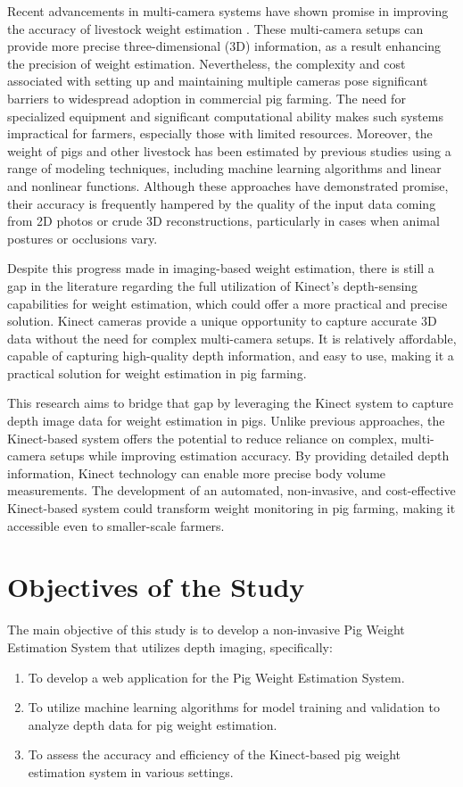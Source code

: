 {Recent advancements in multi-camera systems have shown promise in improving the accuracy of livestock weight estimation \citep{dohmen2022computer}. These multi-camera setups can provide more precise three-dimensional (3D) information, as a result enhancing the precision of weight estimation. Nevertheless, the complexity and cost associated with setting up and maintaining multiple cameras pose significant barriers to widespread adoption in commercial pig farming. The need for specialized equipment and significant computational ability makes such systems impractical for farmers, especially those with limited resources. 
Moreover, the weight of pigs and other livestock has been estimated by previous studies using a range of modeling techniques, including machine learning algorithms and linear and nonlinear functions. Although these approaches have demonstrated promise, their accuracy is frequently hampered by the quality of the input data coming from 2D photos or crude 3D reconstructions, particularly in cases when animal postures or occlusions vary.

Despite this progress made in imaging-based weight estimation, there is still a gap in the literature regarding the full utilization of  Kinect’s depth-sensing capabilities for weight estimation, which could offer a more practical and precise solution. Kinect cameras provide a unique opportunity to capture accurate 3D data without the need for complex multi-camera setups. It is relatively affordable, capable of capturing high-quality depth information, and easy to use, making it a practical solution for weight estimation in pig farming.

This research aims to bridge that gap by leveraging the Kinect system to capture depth image data for weight estimation in pigs. Unlike previous approaches, the Kinect-based system offers the potential to reduce reliance on complex, multi-camera setups while improving estimation accuracy. By providing detailed depth information, Kinect technology can enable more precise body volume measurements. The development of an automated, non-invasive, and cost-effective Kinect-based system could transform weight monitoring in pig farming, making it accessible even to smaller-scale farmers.

\section{Objectives of the Study}

The main objective of this study is to develop a non-invasive Pig Weight Estimation System that utilizes depth imaging, specifically:
\begin{enumerate}
	\item To develop a web application for the Pig Weight Estimation System.
	\item To utilize machine learning algorithms for model training and validation to analyze depth data for pig weight estimation.
	\item To assess the accuracy and efficiency of the Kinect-based pig weight estimation system in various settings.
\end{enumerate}

}
